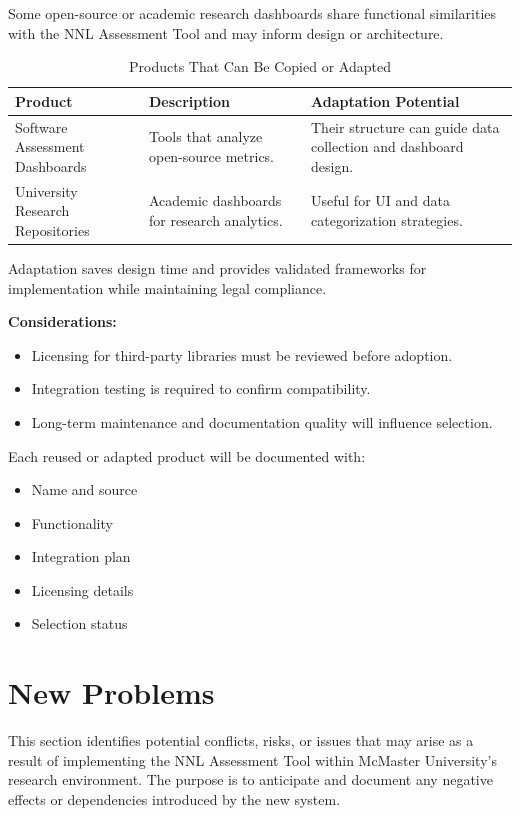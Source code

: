 \documentclass[12pt]{article}
\begin{document}
Some open-source or academic research dashboards share functional similarities with the NNL Assessment Tool and may inform design or architecture.

\begin{table}[hp]
\caption{Products That Can Be Copied or Adapted}
\begin{tabularx}{\textwidth}{p{3cm}X X}
\toprule
\textbf{Product} & \textbf{Description} & \textbf{Adaptation Potential} \\
\midrule
Software Assessment Dashboards & Tools that analyze open-source metrics. & Their structure can guide data collection and dashboard design. \\
\addlinespace[0.3em]
University Research Repositories & Academic dashboards for research analytics. & Useful for UI and data categorization strategies. \\
\bottomrule
\end{tabularx}
\end{table}

Adaptation saves design time and provides validated frameworks for implementation while maintaining legal compliance.

\textbf{Considerations:}
\begin{itemize}
    \item Licensing for third-party libraries must be reviewed before adoption.
    \item Integration testing is required to confirm compatibility.
    \item Long-term maintenance and documentation quality will influence selection.
\end{itemize}

Each reused or adapted product will be documented with:
\begin{itemize}
    \item Name and source
    \item Functionality
    \item Integration plan
    \item Licensing details
    \item Selection status
\end{itemize}


\section{New Problems}

This section identifies potential conflicts, risks, or issues that may arise as a result of implementing the NNL Assessment Tool within McMaster University’s research environment. The purpose is to anticipate and document any negative effects or dependencies introduced by the new system.
\end{document}

